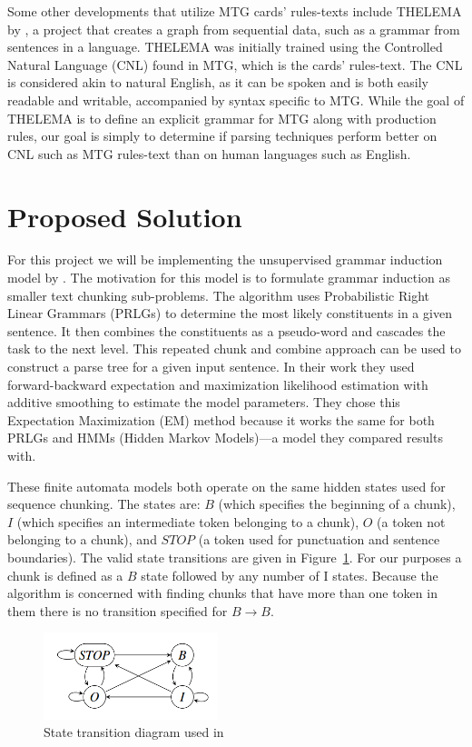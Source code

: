 \documentclass[11pt,a4paper]{article}
\begin{document}
Some other developments that utilize MTG cards’ rules-texts include THELEMA by \citet{patsantzis_2015}, a project that creates a graph from sequential data, such as a grammar from sentences in a language. THELEMA was initially trained using the Controlled Natural Language (CNL) found in MTG, which is the cards’ rules-text. The CNL is considered akin to natural English, as it can be spoken and is both easily readable and writable, accompanied by syntax specific to MTG. While the goal of THELEMA is to define an explicit grammar for MTG along with production rules, our goal is simply to determine if parsing techniques perform better on CNL such as MTG rules-text than on human languages such as English.

\section{Proposed Solution}
For this project we will be implementing the unsupervised grammar induction model by \citet{ponvert-etal-2011-simple}. The motivation for this model is to formulate grammar induction as smaller text chunking sub-problems. The algorithm uses Probabilistic Right Linear Grammars (PRLGs) to determine the most likely constituents in a given sentence. It then combines the constituents as a pseudo-word and cascades the task to the next level. This repeated chunk and combine approach can be used to construct a parse tree for a given input sentence. In their work they used forward-backward expectation and maximization likelihood estimation with additive smoothing to estimate the model parameters. They chose this Expectation Maximization (EM) method because it works the same for both PRLGs and HMMs (Hidden Markov Models)—a model they compared results with.

These finite automata models both operate on the same hidden states used for sequence chunking. The states are: $B$ (which specifies the beginning of a chunk), $I$ (which specifies an intermediate token belonging to a chunk), $O$ (a token not belonging to a chunk), and $STOP$ (a token used for punctuation and sentence boundaries). The valid state transitions are given in Figure~\ref{state-diagram}. For our purposes a chunk is defined as a $B$ state followed by any number of I states. Because the algorithm is concerned with finding chunks that have more than one token in them there is no transition specified for $B \rightarrow B$.

\begin{figure}[h]
	\begin{center}
	\includegraphics[width=2in]{figure1_state_diagram.png}
	\end{center}
	\caption{\label{state-diagram} State transition diagram used in \citet{ponvert-etal-2011-simple} }
\end{figure}
\end{document}
